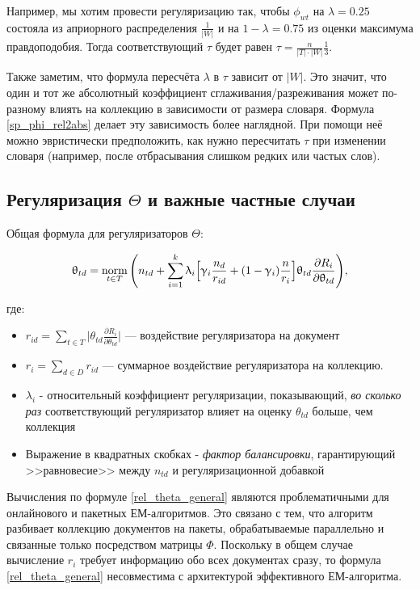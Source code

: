 Например, мы хотим провести регуляризацию так, чтобы $\phi_{wt}$ на $\lambda=0.25$ состояла из априорного распределения $\frac{1}{|W|}$ и на $1-\lambda=0.75$ из оценки максимума правдоподобия. Тогда соответствующий $\tau$ будет равен $\tau = \frac{n}{|T|\cdot|W|} \frac1{3}$.

Также заметим, что формула пересчёта $\lambda$ в $\tau$ зависит от $|W|$. Это значит, что один и тот же абсолютный коэффициент сглаживания/разреживания может по-разному влиять на коллекцию в зависимости от размера словаря.  Формула \ref{sp_phi_rel2abs} делает эту зависимость более наглядной. При помощи неё можно эвристически предположить, как нужно пересчитать $\tau$ при изменении словаря (например, после отбрасывания слишком редких или частых слов).

\subsection{Регуляризация $\Theta$ и важные частные случаи}
Общая формула для регуляризаторов $\Theta$:

\[
\uptheta_{td} = \mathop{\mathrm{norm}}\limits_{t \in T} \Bigg(
    n_{td} + \sum_{i=1}^k \uplambda_i \Big[
        \upgamma_i \frac{n_d}{r_{id}} + (1-\upgamma_i)\frac{n}{r_i}
        \Big]
    \uptheta_{td} \frac{\partial R_i}{\partial \uptheta_{td}}
\Bigg), \label{rel_theta_general}
\]

где:

\begin{itemize}
    \item { $r_{id} = \sum_{t\in T} \Big | \theta_{td} \frac{\partial R_i}{\partial \theta_{td}} \Big | $ --- воздействие регуляризатора на документ}
    \item { $r_{i} = \sum_{d\in D} r_{id}$ --- суммарное воздействие регуляризатора на коллекцию.}
    \item { $\lambda_i$ - относительный коэффициент регуляризации, показывающий, \emph{во сколько раз} соответствующий регуляризатор влияет на оценку $\theta_{td}$ больше, чем коллекция}
    \item {Выражение в квадратных скобках - \textit{фактор балансировки}, гарантирующий >>равновесие>> между $n_{td}$ и регуляризационной добавкой}
\end{itemize}

Вычисления по формуле \ref{rel_theta_general} являются проблематичными для онлайнового и пакетных ЕМ-алгоритмов. Это связано с тем, что алгоритм разбивает коллекцию документов на пакеты, обрабатываемые параллельно и связанные только посредством матрицы $\Phi$. Поскольку в общем случае вычисление $r_i$ требует информацию обо всех документах сразу, то формула \ref{rel_theta_general} несовместима с архитектурой эффективного ЕМ-алгоритма.

